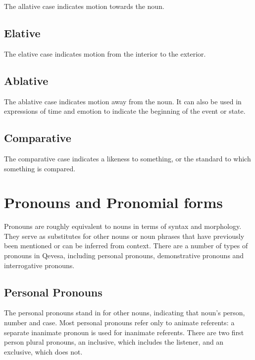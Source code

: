 \documentclass[grammar]{subfiles}
\begin{document}
The allative case indicates motion towards the noun. 


\subsection{Elative}
\label{ssec:ns_elative_case}

The elative case indicates motion from the interior to the exterior.


\subsection{Ablative}
\label{ssec:ns_ablative_case}

The ablative case indicates motion away from the noun.  It can also be used
in expressions of time and emotion to indicate the beginning of the event or
state. 


\subsection{Comparative}
\label{ssec:ns_comparative_case}

The comparative case indicates a likeness to something, or the
standard to which something is compared.



\section{Pronouns and Pronomial forms}
\label{sec:nm_pronouns}

Pronouns are roughly equivalent to nouns in terms of syntax and morphology.
They serve as substitutes for other nouns or noun phrases that have
previously been mentioned or can be inferred from context.  There are a
number of types of pronouns in Qevesa, including personal pronouns,
demonstrative pronouns and interrogative pronouns.



\subsection{Personal Pronouns}
\label{ssec:nm_personal_pronouns}

The personal pronouns stand in for other nouns, indicating that noun's
person, number and case.  Most personal pronouns refer only to animate
referents: a separate inanimate pronoun is used for inanimate referents.
There are two first person plural pronouns, an inclusive, which includes the
listener, and an exclusive, which does not. 
\end{document}
